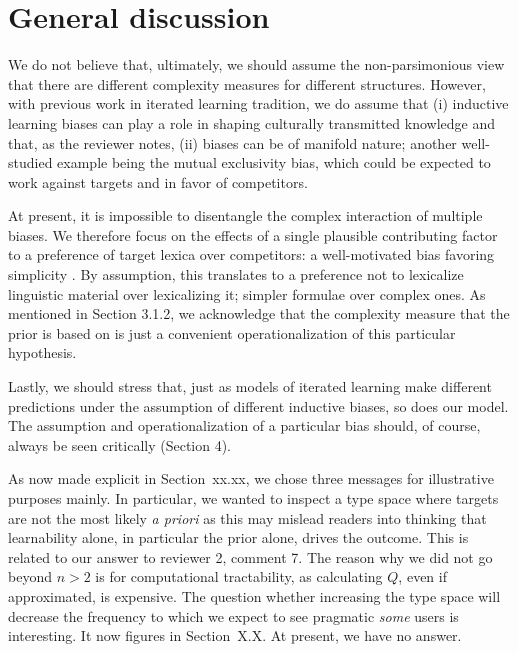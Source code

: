 \documentclass[a4paper, 11pt]{article}
\theoremstyle{Satz}
\newcommand{\hl}[1]{\textcolor[rgb]{.8,.33,.0}{#1}}%
\begin{document}
\section{General discussion}\label{sec:discussion}

\hl{We do not believe that, ultimately, we should assume the non-parsimonious view that there are different complexity measures for different structures. However, with previous work in iterated learning tradition, we do assume that (i) inductive learning biases can play a role in shaping culturally transmitted knowledge and that, as the reviewer notes, (ii) biases can be of manifold nature; another well-studied example being the mutual exclusivity bias, which could be expected to work against targets and in favor of competitors.}

\hl{At present, it is impossible to disentangle the complex interaction of multiple biases. We therefore focus on the effects of a single plausible contributing factor to a preference of target lexica over competitors: a well-motivated bias favoring simplicity \citep{feldman:2000,chater+vitanyi:2003, piantadosi+etal:2012a,kirby+etal:2015,piantadosi+etal:underreview}. By assumption, this translates to a preference not to lexicalize linguistic material over lexicalizing it; simpler formulae over complex ones. As mentioned in Section 3.1.2, we acknowledge that the complexity measure that the prior is based on  is just a convenient operationalization of this particular hypothesis.}

\hl{Lastly, we should stress that, just as models of iterated learning make different predictions under the assumption of different inductive biases, so does our model. The assumption and operationalization of a particular bias should, of course, always be seen critically (Section 4).}


\hl{As now made explicit in \hl{Section~xx.xx}, we chose three messages for illustrative purposes mainly. In particular, we wanted to inspect a type space where targets are not the most likely {\em a priori} as this may mislead readers into thinking that learnability alone, in particular the prior alone, drives the outcome. This is related to our answer to reviewer 2, comment 7. The reason why we did not go beyond $n>2$ is for computational tractability, as calculating $Q$, even if approximated, is expensive. The question whether increasing the type space will decrease the frequency to which we expect to see pragmatic {\em some} users is interesting. It now figures in Section~X.X. At present, we have no answer. }
\end{document}
